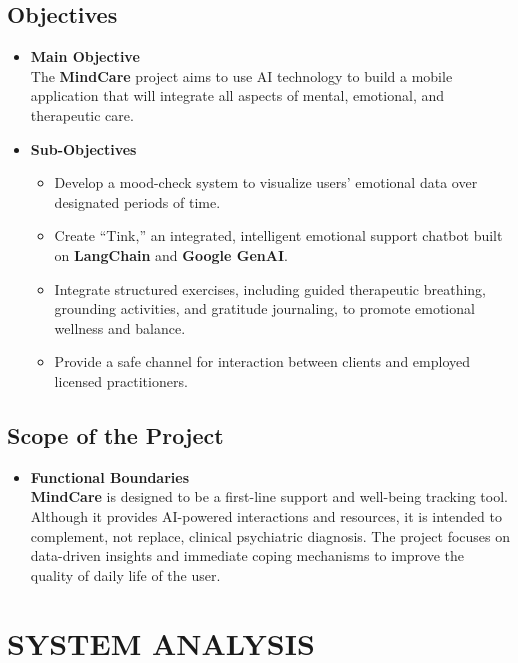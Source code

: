 \documentclass[a4paper,12pt]{report}
\begin{document}
\section{Objectives}
\begin{itemize}
    \item \textbf{Main Objective}\\
    The \textbf{MindCare} project aims to use AI technology to build a mobile application that will integrate all aspects of mental, emotional, and therapeutic care.
    
    \item \textbf{Sub-Objectives}
    \begin{itemize}
        \item Develop a mood-check system to visualize users' emotional data over designated periods of time.
        \item Create ``Tink,'' an integrated, intelligent emotional support chatbot built on \textbf{LangChain} and \textbf{Google GenAI}.
        \item Integrate structured exercises, including guided therapeutic breathing, grounding activities, and gratitude journaling, to promote emotional wellness and balance.
        \item Provide a safe channel for interaction between clients and employed licensed practitioners.
    \end{itemize}
\end{itemize}

\section{Scope of the Project}
\begin{itemize}
    \item \textbf{Functional Boundaries}\\
    \textbf{MindCare} is designed to be a first-line support and well-being tracking tool. Although it provides AI-powered interactions and resources, it is intended to complement, not replace, clinical psychiatric diagnosis. The project focuses on data-driven insights and immediate coping mechanisms to improve the quality of daily life of the user.
\end{itemize}


\chapter{SYSTEM ANALYSIS}
\end{document}
